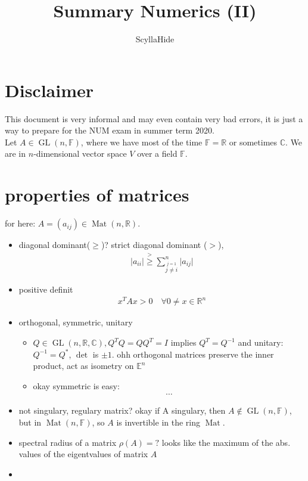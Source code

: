 \documentclass[]{scrartcl}
\title{Summary Numerics (II)}
\author{ScyllaHide}
\newcommand{\EE}{\mathbb{E}}
\newcommand{\C}{\mathbb{C}}
\newcommand{\R}{\mathbb{R}}
\newcommand{\F}{\mathbb{F}}
\newcommand{\<}{\trianglelefteq}
\newcommand{\abs}[1]{\vert #1\vert}
\DeclareMathOperator{\Mat}{Mat}
\DeclareMathOperator{\GL}{GL}
\begin{document}
\maketitle

\section*{Disclaimer}
This document is very informal and may even contain very bad errors, it is just a way to prepare for the NUM exam in summer term 2020.\\

Let $A \in \GL(n,\F)$, where we have most of the time $\F = \R$ or sometimes $\C$. We are in $n$-dimensional vector space $V$ over a field $\F$.

\section*{properties of matrices}
for here: $A = (a_{ij}) \in \Mat(n,\R)$.
\begin{itemize}
	\item diagonal dominant($\ge$)? strict diagonal dominant ($>$),
	\begin{align*}
		\abs{a_{ii}} \overset{>}{\ge} \sum_{\stackrel{j=1}{j\neq i}}^n \abs{a_{ij}}
	\end{align*}
	\item positive definit
	\begin{align*}
		x^T Ax > 0 \quad \forall 0\neq x \in \R^n
	\end{align*}
	\item orthogonal, symmetric, unitary
	\begin{itemize}
		\item $Q \in \GL(n,\R,\C), Q^T Q = Q Q^T = I$ implies $Q^T = Q^{-1}$ and unitary: $Q^{-1} = Q^{\ast}$, $\det$ is $\pm 1$. ohh orthogonal matrices preserve the inner product, act as isometry on $\EE^n$
		\item okay symmetric is easy:
		\begin{align*}
			\dots
		\end{align*}
	\end{itemize}
	\item not singulary, regulary matrix?
	okay if A singulary, then $A \notin \GL(n,\F)$, but in $\Mat(n, \F)$, so $A$ is invertible in the ring $\Mat$.
	\item spectral radius of a matrix $\rho(A) = ?$ looks like the maximum of the abs. values of the eigentvalues of matrix $A$
	\item 
\end{itemize}
\end{document}
